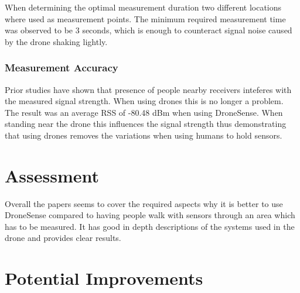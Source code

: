 \documentclass{IEEEtran}
\begin{document}
When determining the optimal measurement duration two different locations where used as measurement points. The minimum required measurement time was observed to be 3 seconds, which is enough to counteract signal noise caused by the drone shaking lightly.

\subsubsection{Measurement Accuracy}

Prior studies have shown that presence of people nearby receivers inteferes with the measured signal strength. When using drones this is no longer a problem. The result was an average RSS of -80.48 dBm when using DroneSense. When standing near the drone this influences the signal strength thus demonstrating that using drones removes the variations when using humans to hold sensors.

\section{Assessment}

Overall the papers seems to cover the required aspects why it is better to use DroneSense compared to having people walk with sensors through an area which has to be measured. It has good in depth descriptions of the systems used in the drone and provides clear results.

\section{Potential Improvements}
\end{document}

